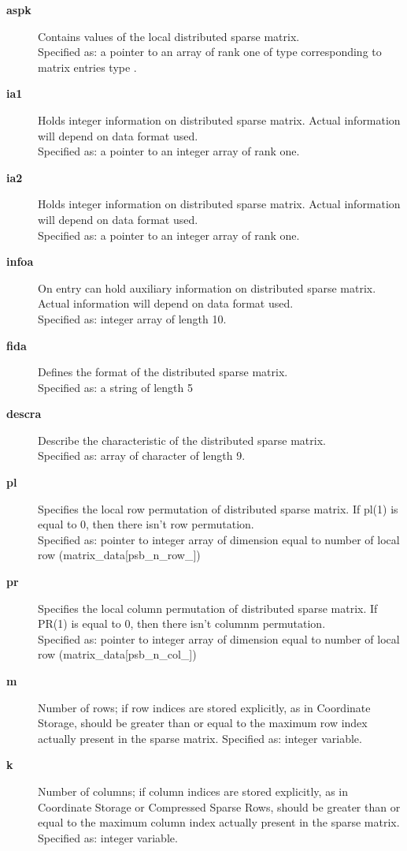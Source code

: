 \begin{description}
\item[{\bf aspk}] Contains values of the local distributed sparse
matrix.\\
Specified as: a pointer to an array of rank one of type corresponding
to matrix entries type .
\item[{\bf ia1}] Holds integer information on distributed sparse
matrix. Actual information will depend on data format used.\\
Specified as: a pointer to an integer array of rank one.
\item[{\bf ia2}] Holds integer information on distributed sparse
matrix. Actual information will depend on data format used.\\
Specified as: a pointer to an integer array of rank one.
\item[{\bf infoa}] On entry can hold auxiliary information on distributed sparse
matrix.  Actual information will depend on data format used.\\
Specified as: integer array of length 10.
\item[{\bf fida}] Defines the format of the distributed sparse matrix.\\
Specified as: a string of length 5
\item[{\bf descra}] Describe the characteristic of the distributed sparse matrix.\\
Specified as: array of character of length 9.
\item[{\bf pl}] Specifies the local row permutation of distributed sparse
matrix. If pl(1) is equal to 0, then there isn't row permutation.\\
Specified as: pointer to integer array of dimension equal to number of local row (matrix\_data[psb\_n\_row\_\hbox{]})
\item[{\bf pr}] Specifies the local column permutation of distributed sparse
matrix. If PR(1) is equal to 0, then there isn't columnm permutation.\\
Specified as: pointer to integer array of dimension equal to number of
local row (matrix\_data[psb\_n\_col\_\hbox{]})
\item[{\bf m}] Number of rows; if row indices are stored explicitly,
as in Coordinate Storage, should be greater than or equal to the
maximum row index actually present in the sparse matrix.
Specified as: integer variable.
\item[{\bf k}] Number of columns; if column indices are stored explicitly,
as in Coordinate Storage or Compressed Sparse Rows, should be greater
than or equal to the maximum column  index actually present in the sparse matrix.
Specified as: integer variable.
\end{description}
